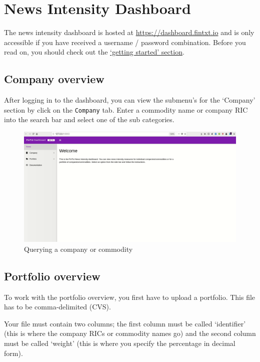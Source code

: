 \documentclass[]{book}
\theoremstyle{definition}
\theoremstyle{definition}
\theoremstyle{definition}
\theoremstyle{remark}
\begin{document}
\chapter{News Intensity Dashboard}\label{thedashboard}

The news intensity dashboard is hosted at
\href{https://dashboard.fintxt.io/app/FinTxtDashboard}{https://dashboard.fintxt.io}
and is only accessible if you have received a username / password
combination. Before you read on, you should check out the
\href{https://fintxt.github.io/documentation/gettinstarted.html}{`getting
started' section}.

\section{Company overview}\label{company-overview}

After logging in to the dashboard, you can view the submenu's for the
`Company' section by click on the \texttt{Company} tab. Enter a
commodity name or company RIC into the search bar and select one of the
sub categories.

\begin{figure}
\centering
\includegraphics{img/company_overview.gif}
\caption{Querying a company or commodity}
\end{figure}

\section{Portfolio overview}\label{portfolio-overview}

To work with the portfolio overview, you first have to upload a
portfolio. This file has to be comma-delimited (CVS).

Your file must contain two columns; the first column must be called
`identifier' (this is where the company RICs or commodity names go) and
the second column must be called `weight' (this is where you specify the
percentage in decimal form).
\end{document}

